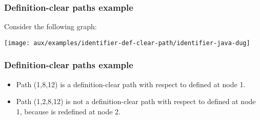 \begin{frame}[hasprev=false,hasnext=true]
\label{example:identifier-def-clear-path}
\frametitle{Definition-clear paths example}

Consider the following graph:

\texttt{[image: aux/examples/identifier-def-clear-path/identifier-java-dug]}
\end{frame}



\begin{frame}[hasprev=true,hasnext=false]
\frametitle{Definition-clear paths example}

\begin{itemize}
	\item Path (1,8,12) is a definition-clear path with respect to
	 defined at node 1.

	\item Path (1,2,8,12) is not a definition-clear path with respect to
	 defined at node 1, because  is
	redefined at node 2.
\end{itemize}

\end{frame}